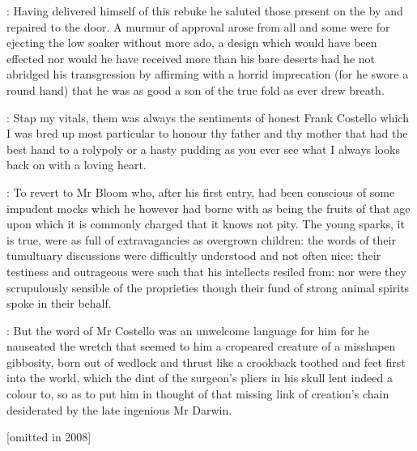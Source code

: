 :
Having delivered himself of this rebuke he saluted those present
on the by and repaired to the door.
A murmur of approval arose from all
and some were for ejecting the low soaker without more ado,
a design
which would have been effected nor would he have received more than his
bare deserts had he not abridged his transgression by affirming with a
horrid imprecation
(for he swore a round hand)
that he was as good a son
of the true fold as ever drew breath.

\punch:
Stap my vitals,
them was always the sentiments of honest Frank
Costello which I was bred up most particular to honour thy father and thy
mother that had the best hand to a rolypoly or a hasty pudding as you ever
see what I always looks back on with a loving heart.



:
To revert to Mr Bloom who,
after his first entry,
had been conscious
of some impudent mocks which he however had borne with as being the fruits
of that age upon which it is commonly charged that it knows not pity.
The
young sparks,
it is true,
were as full of extravagancies as overgrown
children:
the words of their tumultuary discussions were difficultly
understood and not often nice:
their testiness and outrageous  were such that his intellects resiled from:
nor were they
scrupulously sensible of the proprieties though their fund of strong
animal spirits spoke in their behalf.

:
But the word of Mr Costello was an unwelcome language for him for he
nauseated the wretch that seemed to him a cropeared creature of a
misshapen gibbosity,
born out of wedlock and thrust like a crookback
toothed and feet first into the world,
which the dint of the surgeon's
pliers in his skull lent indeed a colour to,
so as to put him in thought
of that missing link of creation's chain desiderated by the late ingenious
Mr Darwin.

[omitted in 2008]


